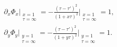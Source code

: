 \documentclass[11pt]{article}
\begin{document}
\begin{subequations}\begin{align}
    \partial_x \Phi_x \Bigg\vert_{\substack{x=1 \\ \tau=\infty}} = 
    -\frac{(\tau-\tau')^2}{(1+x\tau)^2} \Bigg\vert_{\substack{x=1 \\ \tau=\infty}} = 1, \\
    \partial_y \Phi_y \Bigg\vert_{\substack{y=1 \\ \tau=\infty}} =
    -\frac{(\tau-\tau')^2}{(1+y\tau)^2} \Bigg\vert_{\substack{y=1 \\ \tau=\infty}} = 1.
\end{align}\end{subequations}


\end{document}
